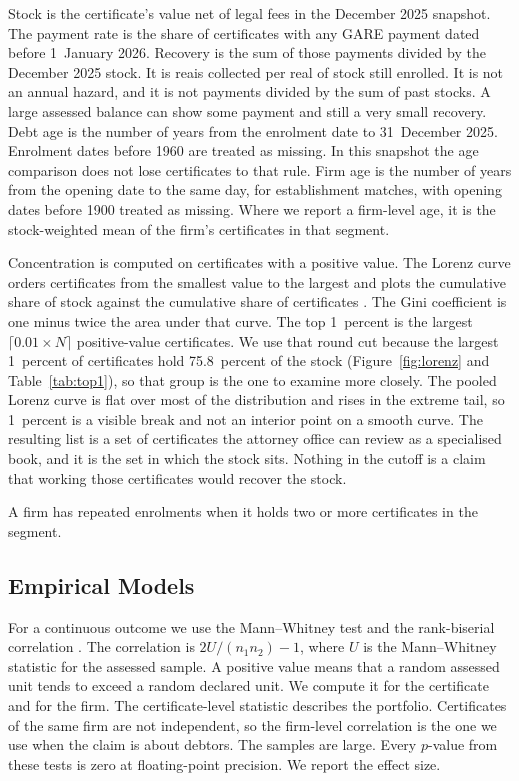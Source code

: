 Stock is the certificate's value net of legal fees in the December 2025 snapshot.
The payment rate is the share of certificates with any GARE payment dated before 1~January 2026.
Recovery is the sum of those payments divided by the December 2025 stock.
It is reais collected per real of stock still enrolled.
It is not an annual hazard, and it is not payments divided by the sum of past stocks.
A large assessed balance can show some payment and still a very small recovery.
Debt age is the number of years from the enrolment date to 31~December 2025.
Enrolment dates before 1960 are treated as missing.
In this snapshot the age comparison does not lose certificates to that rule.
Firm age is the number of years from the opening date to the same day, for establishment matches, with opening dates before 1900 treated as missing.
Where we report a firm-level age, it is the stock-weighted mean of the firm's certificates in that segment.

Concentration is computed on certificates with a positive value.
The Lorenz curve orders certificates from the smallest value to the largest and plots the cumulative share of stock against the cumulative share of certificates \citep{lorenz1905}.
The Gini coefficient is one minus twice the area under that curve.
The top 1~percent is the largest $\lceil 0.01 \times N \rceil$ positive-value certificates.
We use that round cut because the largest 1~percent of certificates hold 75.8~percent of the stock (Figure~\ref{fig:lorenz} and Table~\ref{tab:top1}), so that group is the one to examine more closely.
The pooled Lorenz curve is flat over most of the distribution and rises in the extreme tail, so 1~percent is a visible break and not an interior point on a smooth curve.
The resulting list is a set of certificates the attorney office can review as a specialised book, and it is the set in which the stock sits.
Nothing in the cutoff is a claim that working those certificates would recover the stock.

A firm has repeated enrolments when it holds two or more certificates in the segment.

\subsection{Empirical Models}\label{sec:inference}

For a continuous outcome we use the Mann--Whitney test and the rank-biserial correlation \citep{mann1947,kerby2014}.
The correlation is $2U/(n_1 n_2) - 1$, where $U$ is the Mann--Whitney statistic for the assessed sample.
A positive value means that a random assessed unit tends to exceed a random declared unit.
We compute it for the certificate and for the firm.
The certificate-level statistic describes the portfolio.
Certificates of the same firm are not independent, so the firm-level correlation is the one we use when the claim is about debtors.
The samples are large.
Every $p$-value from these tests is zero at floating-point precision.
We report the effect size.

